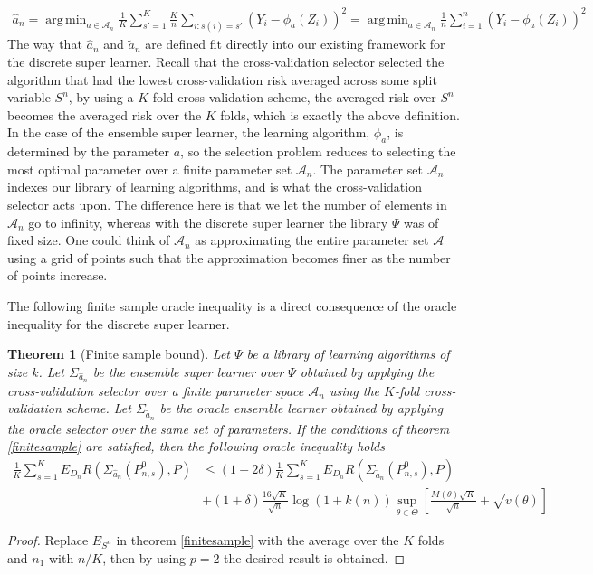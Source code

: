 \documentclass[11pt, a4paper]{article}
\DeclareMathOperator*{\argmin}{arg\,min}
\newtheorem{theorem}{Theorem}
\theoremstyle{definition}
\theoremstyle{remark}
\newcommand{\btheta}{\theta}
\newcommand{\Sn}{S^n}
\newcommand{\lib}{\Psi}
\newcommand{\meta}{\phi}
\newcommand{\esl}{\Sigma}
\begin{document}
\begin{align*}
    \hat{a}_n = \argmin_{a \in \mathcal{A}_n} \frac{1}{K} \sum_{s' = 1}^{K} \frac{K}{n} \sum_{i: s(i) = s'} (Y_i - \meta_{a}(Z_i))^2 = \argmin_{a \in \mathcal{A}_n} \frac{1}{n} \sum_{i = 1}^{n} (Y_i - \meta_{a}(Z_i))^2   
\end{align*}
The way that $ \hat{a}_n  $ and $ \tilde{a}_n $ are defined fit directly into our existing framework for the discrete super learner. Recall that the cross-validation selector selected the algorithm that had the lowest cross-validation risk averaged across some split variable $ \Sn $, by using a $ K $-fold cross-validation scheme, the averaged risk over $ \Sn $ becomes the averaged risk over the $ K $ folds, which is exactly the above definition. In the case of the ensemble super learner, the learning algorithm, $ \meta_{a} $, is determined by the parameter $ a $, so the selection problem reduces to selecting the most optimal parameter over a finite parameter set $ \mathcal{A}_n $. The parameter set $ \mathcal{A}_n $ indexes our library of learning algorithms, and is what the cross-validation selector acts upon. The difference here is that we let the number of elements in $ \mathcal{A}_n $ go to infinity, whereas with the discrete super learner the library $ \lib $ was of fixed size. One could think of $ \mathcal{A}_n $ as approximating the entire parameter set $ \mathcal{A} $ using a grid of points such that the approximation becomes finer as the number of points increase.

The following finite sample oracle inequality is a direct consequence of the oracle inequality for the discrete super learner.

\begin{theorem}[Finite sample bound]
    Let $ \lib $ be a library of learning algorithms of size $ k $. Let $ \esl_{ \hat{a}_{n} } $ be the ensemble super learner over $ \lib $ obtained by applying the cross-validation selector over a finite parameter space $ \mathcal{A}_n $ using the $ K $-fold cross-validation scheme. Let $ \esl_{ \tilde{a}_n } $ be the oracle ensemble learner obtained by applying the oracle selector over the same set of parameters. If the conditions of theorem \ref{finitesample} are satisfied, then the following oracle inequality holds
    \begin{align*}
        \frac{1}{K} \sum_{s = 1}^{K} E_{D_n} R(\esl_{ \hat{a}_n }(P_{n, s}^{0}) , P) &\leq (1 + 2 \delta) \frac{1}{K} \sum_{s = 1}^{K} E_{D_n} R(\esl_{ \tilde{a}_n }(P_{n,s}^{0}), P) \\
                                                                                     &+ (1 + \delta) \frac{16 \sqrt{K}}{\sqrt{n}} \log(1 + k(n)) \sup_{\btheta \in \Theta} \left[ \frac{M(\btheta ) \sqrt{K}}{\sqrt{n}} + \sqrt{v(\btheta)}\right]  
    \end{align*}
\end{theorem}
\begin{proof}
    Replace $ E_{\Sn} $ in theorem \ref{finitesample} with the average over the $ K $ folds and $ n_1$ with $n/K $, then by using $ p = 2 $ the desired result is obtained.  
\end{proof}
\end{document}
